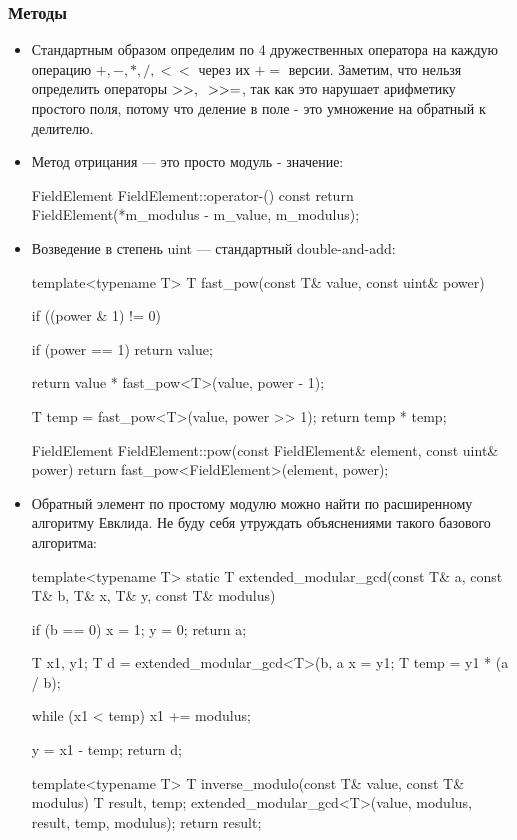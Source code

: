 \subsubsection{Методы}
\begin{itemize}
  \item Стандартным образом определим по 4 дружественных оператора на каждую операцию $+,-,*,/,<<$ через их $+=$ версии. Заметим, что нельзя определить операторы $>>,\hspace{0.2cm} >>=$, так как это нарушает арифметику простого поля, потому что деление в поле - это умножение на обратный к делителю.

  \item Метод отрицания --- это просто модуль - значение:
  \begin{cppcode}
FieldElement FieldElement::operator-() const {
    return FieldElement(*m_modulus - m_value, m_modulus);
}
  \end{cppcode}
  \item   Возведение в степень uint --- стандартный double-and-add:
  \begin{cppcode}
template<typename T>
T fast_pow(const T& value, const uint& power) {
    if ((power & 1) != 0) {
        if (power == 1) {
            return value;
        }

        return value * fast_pow<T>(value, power - 1);
    }

    T temp = fast_pow<T>(value, power >> 1);
    return temp * temp;
}

FieldElement FieldElement::pow(const FieldElement& element, const uint& power) {
    return fast_pow<FieldElement>(element, power);
}
  \end{cppcode}

  \item Обратный элемент по простому модулю можно найти по расширенному алгоритму Евклида. Не буду себя утруждать объяснениями такого базового алгоритма:
  \begin{cppcode}
template<typename T>
static T extended_modular_gcd(const T& a, const T& b, T& x, T& y, const T& modulus) {
    if (b == 0) {
        x = 1;
        y = 0;
        return a;
    }

    T x1, y1;
    T d = extended_modular_gcd<T>(b, a %
    x = y1;
    T temp = y1 * (a / b);

    while (x1 < temp) {
        x1 += modulus;
    }

    y = x1 - temp;
    return d;
}

template<typename T>
T inverse_modulo(const T& value, const T& modulus) {
    T result, temp;
    extended_modular_gcd<T>(value, modulus, result, temp, modulus);
    return result;
}


\end{cppcode}
\end{itemize}
